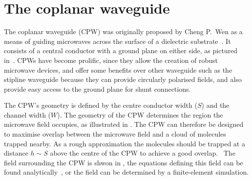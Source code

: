 
\section{The coplanar waveguide}


The coplanar waveguide (CPW) was originally proposed by Cheng P.~Wen as a
means of guiding microwaves across the surface of a dielectric
substrate~\cite{1127105}. It consists of a central conductor with a ground
plane on either side, as pictured in~. CPWs have become
prolific, since they allow the creation of robust microwave devices, and offer
some benefits over other waveguide  such as the stipline
waveguide because they can provide circularly polarised fields, and also
provide easy access to the ground plane for shunt connections.

The CPW's geometry is defined by the centre conductor width ($S$) and the
channel width ($W$). The geometry of the CPW determines the region the
microwave field occupies, as illustrated in .
The CPW can therefore be designed to maximise overlap between the microwave
field and a cloud of molecules trapped nearby.  As a rough approximation the
molecules should be trapped at a distance $h\sim S$ above the centre of the CPW
to achieve a good overlap.~\cite{Boehi2009} The field surrounding the CPW is
shwon in , the equations defining this field can be
found analytically~\cite{Simons2004}, or the field can be determined by a
finite-element simulation.


\begin{figure}
  \caption{}
  \label{mws:fig:CPW}
\end{figure}


